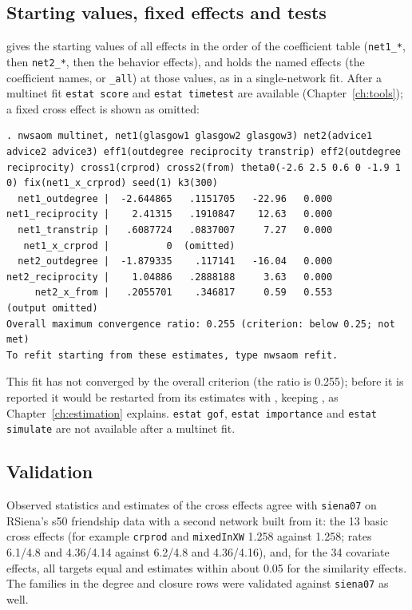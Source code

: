 \subsection{Starting values, fixed effects and tests}
 gives the starting values of all effects in the order of the coefficient table (\texttt{net1\_*}, then \texttt{net2\_*}, then the behavior effects), and  holds the named effects (the coefficient names, or \texttt{\_all}) at those values, as in a single-network fit. After a multinet fit \texttt{estat score} and \texttt{estat timetest} are available (Chapter~\ref{ch:tools}); a fixed cross effect is shown as omitted:
\begin{lstlisting}
. nwsaom multinet, net1(glasgow1 glasgow2 glasgow3) net2(advice1 advice2 advice3) eff1(outdegree reciprocity transtrip) eff2(outdegree reciprocity) cross1(crprod) cross2(from) theta0(-2.6 2.5 0.6 0 -1.9 1 0) fix(net1_x_crprod) seed(1) k3(300)
  net1_outdegree |  -2.644865   .1151705   -22.96   0.000
net1_reciprocity |    2.41315   .1910847    12.63   0.000
  net1_transtrip |   .6087724   .0837007     7.27   0.000
   net1_x_crprod |          0  (omitted)
  net2_outdegree |  -1.879335    .117141   -16.04   0.000
net2_reciprocity |    1.04886   .2888188     3.63   0.000
     net2_x_from |   .2055701    .346817     0.59   0.553
(output omitted)
Overall maximum convergence ratio: 0.255 (criterion: below 0.25; not met)
To refit starting from these estimates, type nwsaom refit.
\end{lstlisting}
This fit has not converged by the overall criterion (the ratio is 0.255); before it is reported it would be restarted from its estimates with , keeping , as Chapter~\ref{ch:estimation} explains.
\texttt{estat gof}, \texttt{estat importance} and \texttt{estat simulate} are not available after a multinet fit.

\subsection{Validation}

Observed statistics and estimates of the cross effects agree with \texttt{siena07} on RSiena's s50 friendship data with a second network built from it: the 13 basic cross effects (for example \texttt{crprod} and \texttt{mixedInXW} 1.258 against 1.258; rates 6.1/4.8 and 4.36/4.14 against 6.2/4.8 and 4.36/4.16), and, for the 34 covariate effects, all targets equal and estimates within about 0.05 for the similarity effects. The families in the degree and closure rows were validated against \texttt{siena07} as well.

